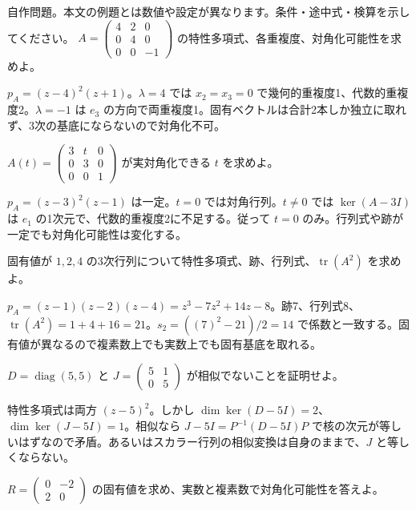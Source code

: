 \documentclass[11pt]{article}
\begin{document}
自作問題。本文の例題とは数値や設定が異なります。条件・途中式・検算を示してください。
\problem[重根と固有空間]
$A=\begin{pmatrix}4&2&0\\0&4&0\\0&0&-1\end{pmatrix}$ の特性多項式、各重複度、対角化可能性を求めよ。
\begin{ans}
$p_A=(z-4)^2(z+1)$。$\lambda=4$ では $x_2=x_3=0$ で幾何的重複度1、代数的重複度2。$\lambda=-1$ は $e_3$ の方向で両重複度1。固有ベクトルは合計2本しか独立に取れず、3次の基底にならないので対角化不可。
\end{ans}
\problem[パラメータと対角化]
$A(t)=\begin{pmatrix}3&t&0\\0&3&0\\0&0&1\end{pmatrix}$ が実対角化できる $t$ を求めよ。
\begin{ans}
$p_A=(z-3)^2(z-1)$ は一定。$t=0$ では対角行列。$t\ne0$ では $\ker(A-3I)$ は $e_1$ の1次元で、代数的重複度2に不足する。従って $t=0$ のみ。行列式や跡が一定でも対角化可能性は変化する。
\end{ans}
\newpage
\problem[3次の係数]
固有値が $1,2,4$ の3次行列について特性多項式、跡、行列式、$\operatorname{tr}(A^2)$ を求めよ。
\begin{ans}
$p_A=(z-1)(z-2)(z-4)=z^3-7z^2+14z-8$。跡7、行列式8、$\operatorname{tr}(A^2)=1+4+16=21$。$s_2=((7)^2-21)/2=14$ で係数と一致する。固有値が異なるので複素数上でも実数上でも固有基底を取れる。
\end{ans}
\problem[同じ多項式でも相似でない]
$D=\operatorname{diag}(5,5)$ と $J=\begin{pmatrix}5&1\\0&5\end{pmatrix}$ が相似でないことを証明せよ。
\begin{ans}
特性多項式は両方 $(z-5)^2$。しかし $\dim\ker(D-5I)=2$、$\dim\ker(J-5I)=1$。相似なら $J-5I=P^{-1}(D-5I)P$ で核の次元が等しいはずなので矛盾。あるいはスカラー行列の相似変換は自身のままで、$J$ と等しくならない。
\end{ans}
\newpage
\problem[体による違い]
$R=\begin{pmatrix}0&-2\\2&0\end{pmatrix}$ の固有値を求め、実数と複素数で対角化可能性を答えよ。
\end{document}
